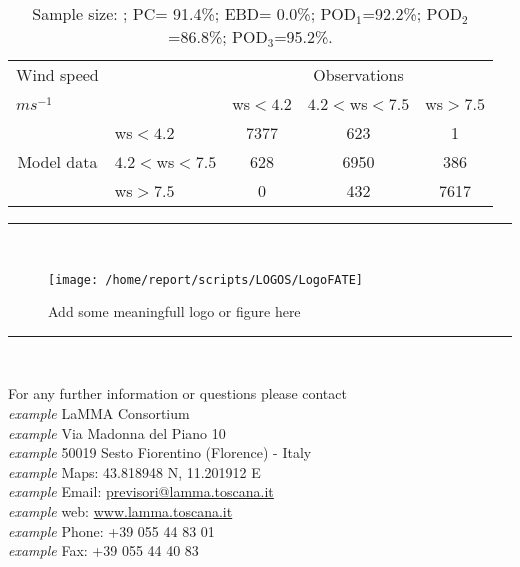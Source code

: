 \documentclass[11pt,english]{article}
\newcommand{\HRule}{\rule{\linewidth}{0.5mm}}
\begin{document}
\begin{table}[tbp]
\begin{center}
\begin{tabular}{llccc}
\hline
{Wind speed}                                       &                                                    & \multicolumn{3}{c}{Observations}                 \\
{$m s^{-1}$}                                       &                             & ws$<4.2$   & $4.2<$ws$<7.5$ & ws$>7.5$ \\
\hline
\multicolumn{1}{c}{\multirow{3}{*}{Model data}}  & ws$<4.2$          & 7377                & 623                       & 1              \\
                                                 & $4.2<$ws$<7.5$ & 628                & 6950                       & 386              \\
                                                 & ws$>7.5$          & 0                & 432                       & 7617              \\
\hline
\end{tabular}
\end{center}
\caption{Sample size: ; PC= 91.4\%; EBD= 0.0\%; POD$_1$=92.2\%; POD$_2$=86.8\%; POD$_3$=95.2\%.}\label{tab:contingency}
\end{table}

\clearpage

\begin{center}
\HRule \\[0.4cm]
\begin{figure}[htbp]
\centering
{\texttt{[image: /home/report/scripts/LOGOS/LogoFATE]}}
\caption{Add some meaningfull logo or figure here}
\end{figure}
\HRule \\[0.4cm]
\end{center}

\vspace{5.55cm}
\begin{flushright}
\large{For any further information or questions please contact
\\\textit{example} LaMMA Consortium
\\\textit{example} Via Madonna del Piano 10
\\\textit{example} 50019 Sesto Fiorentino (Florence) - Italy
\\\textit{example} Maps: 43.818948 N, 11.201912 E
\\\textit{example} Email: \href{mailto:previsori@lamma.toscana.it}{previsori@lamma.toscana.it}
\\\textit{example} web: \href{www.lamma.toscana.it}{www.lamma.toscana.it}
\\\textit{example} Phone: +39 055 44 83 01
\\\textit{example} Fax: +39 055 44 40 83}
\end{flushright}

\end{document}
